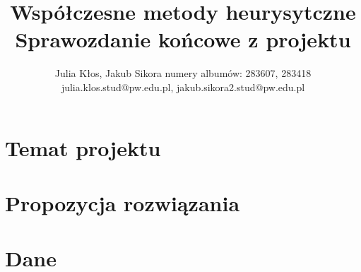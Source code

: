 \documentclass{article}
\title{Współczesne metody heurysytczne\\ Sprawozdanie końcowe z projektu}
\author{
Julia Kłos, Jakub Sikora
\affiliations
numery albumów: 283607, 283418 \\
\emails
julia.klos.stud@pw.edu.pl, jakub.sikora2.stud@pw.edu.pl
}
\begin{document}
\maketitle

\section{Temat projektu}
\label{sec:temat}

\section{Propozycja rozwiązania}
\label{sec:rozwiazanie}

\section{Dane}
\label{sec:dane}
\end{document}
